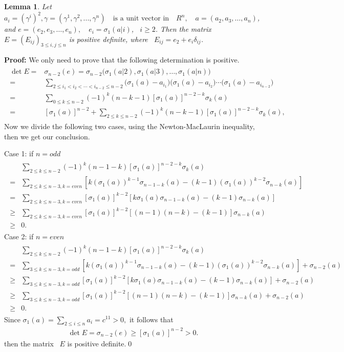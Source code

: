 \documentclass[11pt]{amsart}
\newtheorem{Lem}[Thm]{Lemma}
\numberwithin{equation}{section}
\begin{document}
\begin{Lem}\label{Lem4.2} Let $a_i=(\gamma^i)^2, \gamma = (\gamma^1, \gamma^2, ...,\gamma^n) \quad \text{is  a unit vector in} \quad R^n, \quad a=(a_2, a_3, \ldots, a_n)$, and $e=(e_2, e_3, \ldots, e_n), \quad e_i=\sigma_1(a|i)$, ~$i\geq 2$. Then the matrix
~$E=(E_{ij})_{3\leq i,j\leq n}$ is positive definite, where ~$ E_{ij}=e_2+e_i\delta_{ij}$.
\end{Lem}
{\bf Proof:} We only need to prove that the following determination is positive.
\begin{align}\label{4.1}
\begin{split}
\det E=&\sigma_{n-2}(e)
=\sigma_{n-2}\big(\sigma_1(a|2), \sigma_1(a|3), \ldots, \sigma_1(a|n)\big)\\
=&\sum_{2\leq i_1<i_2<\cdots< i_{n-2}\leq n-2}\big(\sigma_1(a)-a_{i_1}\big)\big(\sigma_1(a)-a_{i_2}\big)\cdots \big(\sigma_1(a)-a_{i_{n-2}}\big)\\
=&\sum_{0\leq k\leq n-2}(-1)^k(n-k-1)[\sigma_1(a)]^{n-2-k}\sigma_k(a)\\
=&[\sigma_1(a)]^{n-2}+\sum_{2\leq k\leq n-2}(-1)^k(n-k-1)[\sigma_1(a)]^{n-2-k}\sigma_k(a),
\end{split}
\end{align}
Now we divide the following two cases, using the  Newton-MacLaurin inequality, then we get our conclusion.

Case 1:  if $ n=odd$
\begin{align}\label{4.2}
\begin{split}
&\sum_{2\leq k\leq n-2}(-1)^k(n-1-k)[\sigma_1(a)]^{n-2-k}\sigma_k(a)\\
=&\sum_{2\leq k\leq n-3,k=even}[k(\sigma_1(a))^{k-1}\sigma_{n-1-k}(a)-(k-1)(\sigma_1(a))^{k-2}\sigma_{n-k}(a)]\\
=&\sum_{2\leq k\leq n-3,k=even}[\sigma_1(a)]^{k-2}[k \sigma_1(a)\sigma_{n-1-k}(a)-(k-1)\sigma_{n-k}(a)]\\
\geq&\sum_{2\leq k\leq n-3,k=even}[\sigma_1(a)]^{k-2}[(n-1)(n-k)-(k-1)]\sigma_{n-k}(a)\\
\geq& 0.
\end{split}
\end{align}
Case 2: if $ n=even$
\begin{align}\label{4.3}
\begin{split}
&\sum_{2\leq k\leq n-2}(-1)^k(n-1-k)[\sigma_1(a)]^{n-2-k}\sigma_k(a)\\
=&\sum_{3\leq k\leq n-3,k=odd}[k(\sigma_1(a))^{k-1}\sigma_{n-1-k}(a)-(k-1)(\sigma_1(a))^{k-2}\sigma_{n-k}(a)]+\sigma_{n-2}(a)\\
\geq&\sum_{3\leq k\leq n-3,k=odd}[\sigma_1(a)]^{k-2}[k\sigma_1(a)\sigma_{n-1-k}(a)-(k-1)\sigma_{n-k}(a)]+\sigma_{n-2}(a)\\
\geq&\sum_{3\leq k\leq n-3,k=odd}[\sigma_1(a)]^{k-2}[(n-1)(n-k)-(k-1)]\sigma_{n-k}(a)+\sigma_{n-2}(a)\\
\geq& 0.
\end{split}
\end{align}
Since  $\sigma_1(a)=\sum_{2\leq i\leq n}a_i=c^{11}>0,$
it follows that
\begin{align}\label{4.4}
\det E=\sigma_{n-2}(e)\geq[\sigma_1(a)]^{n-2}>0.
\end{align}
then the matrix ~$E$ is positive definite.\qed
\end{document}
